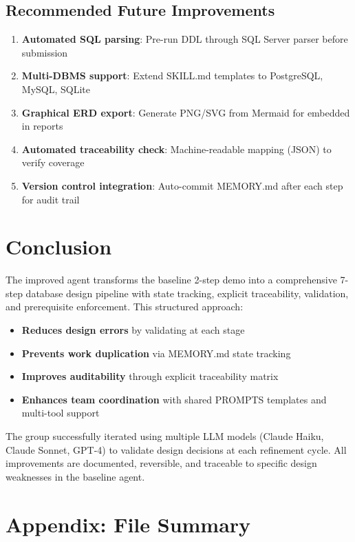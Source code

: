 \documentclass[12pt,a4paper]{article}
\begin{document}
\subsection{Recommended Future Improvements}
\begin{enumerate}
    \item \textbf{Automated SQL parsing}: Pre-run DDL through SQL Server parser before submission
    \item \textbf{Multi-DBMS support}: Extend SKILL.md templates to PostgreSQL, MySQL, SQLite
    \item \textbf{Graphical ERD export}: Generate PNG/SVG from Mermaid for embedded in reports
    \item \textbf{Automated traceability check}: Machine-readable mapping (JSON) to verify coverage
    \item \textbf{Version control integration}: Auto-commit MEMORY.md after each step for audit trail
\end{enumerate}

\section{Conclusion}

The improved agent transforms the baseline 2-step demo into a comprehensive 7-step database design pipeline with state tracking, explicit traceability, validation, and prerequisite enforcement. This structured approach:

\begin{itemize}
    \item \textbf{Reduces design errors} by validating at each stage
    \item \textbf{Prevents work duplication} via MEMORY.md state tracking
    \item \textbf{Improves auditability} through explicit traceability matrix
    \item \textbf{Enhances team coordination} with shared PROMPTS templates and multi-tool support
\end{itemize}

The group successfully iterated using multiple LLM models (Claude Haiku, Claude Sonnet, GPT-4) to validate design decisions at each refinement cycle. All improvements are documented, reversible, and traceable to specific design weaknesses in the baseline agent.

\section*{Appendix: File Summary}
\end{document}
